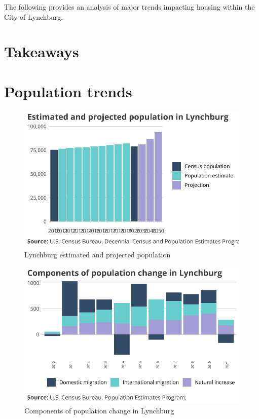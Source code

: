 \documentclass[
  letterpaper,
  DIV=11,
  numbers=noendperiod]{scrreprt}
\begin{document}
The following provides an analysis of major trends impacting housing
within the City of Lynchburg.

\hypertarget{takeaways-2}{%
\section{Takeaways}\label{takeaways-2}}

\hypertarget{population-trends-2}{%
\section{Population trends}\label{population-trends-2}}

\begin{figure}[H]

{\centering \includegraphics{./part-3-3_files/figure-pdf/fig-pop-2020-1.pdf}

}

\caption{\label{fig-pop-2020}Lynchburg estimated and projected
population}

\end{figure}

\begin{figure}[H]

{\centering \includegraphics{./part-3-3_files/figure-pdf/fig-local-chg-1.pdf}

}

\caption{\label{fig-local-chg}Components of population change in
Lynchburg}

\end{figure}
\end{document}
